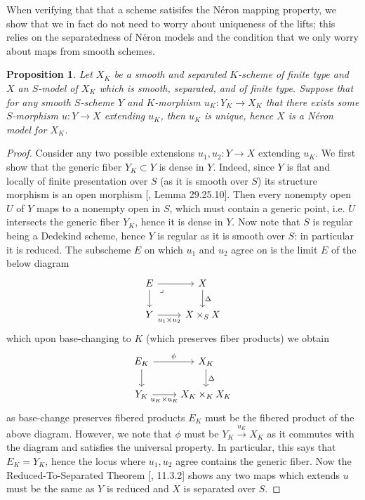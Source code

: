 \documentclass{article}
\theoremstyle{definition}
\theoremstyle{remark}
\theoremstyle{plain}
\newtheorem{proposition}[theorem]{Proposition}
\begin{document}
When verifying that that a scheme satisifes the N\'eron mapping property, we show that we in fact do not need to worry about uniqueness of the lifts; this relies on the separatedness of N\'eron models and the condition that we only worry about maps from smooth schemes. 

\begin{proposition}\label{unique-extension}
Let $X_K$ be a smooth and separated $K$-scheme of finite type and $X$ an $S$-model of $X_K$ which is smooth, separated, and of finite type.
Suppose that for any smooth $S$-scheme $Y$ and $K$-morphism $u_K: Y_K \to X_K$ that there exists some $S$-morphism $u: Y \to X$ extending $u_K$, then $u_K$ is unique, hence $X$ is a N\'eron model for $X_K$.
\end{proposition}

\begin{proof}
	Consider any two possible extensions $u_1, u_2: Y \to X$ extending $u_K$.
	We first show that the generic fiber $Y_K \subset Y$ is dense in $Y$.
	Indeed, since $Y$ is flat and locally of finite presentation over $S$ (as it is smooth over $S$) its structure morphism is an open morphism [\cite{SP}, Lemma 29.25.10]. 
Then every nonempty open $U$ of $Y$ maps to a nonempty open in $S$, which must contain a generic point, i.e. $U$ intersects the generic fiber $Y_K$, hence it is dense in $Y$. \newline
\indent Now note that $S$ is regular being a Dedekind scheme, hence $Y$ is regular as it is smooth over $S$: in particular it is reduced. 
The subscheme $E$ on which $u_1$ and $u_2$ agree on is the limit $E$ of the below diagram 
\[\begin{tikzcd}
	E & X \\
	Y & {X \times_S X}
	\arrow[from=1-1, to=1-2]
	\arrow[from=1-1, to=2-1]
	\arrow["\lrcorner"{anchor=center, pos=0.125}, draw=none, from=1-1, to=2-2]
	\arrow["\Delta", from=1-2, to=2-2]
	\arrow["{u_1 \times u_2}"', from=2-1, to=2-2]
\end{tikzcd}\]
which upon base-changing to $K$ (which preserves fiber products) we obtain 
\[\begin{tikzcd}
	{E_K} & {X_K} \\
	{Y_K} & {X_K \times_K X_K}
	\arrow["\phi", from=1-1, to=1-2]
	\arrow[""', from=1-1, to=2-1]
	\arrow["\Delta", from=1-2, to=2-2]
	\arrow["{u_K \times u_K}"', from=2-1, to=2-2]
\end{tikzcd}\]
as base-change preserves fibered products $E_K$ must be the fibered product of the above diagram.
However, we note that $\phi$ must be $Y_K \xrightarrow{u_K} X_K$ as it commutes with the diagram and satisfies the universal property.
In particular, this says that $E_K = Y_K$, hence the locus where $u_1, u_2$ agree contains the generic fiber.
Now the Reduced-To-Separated Theorem [\cite{FOAG}, 11.3.2] shows any two maps which extends $u$ must be the same as $Y$ is reduced and $X$ is separated over $S$.
\end{proof}
\end{document}
